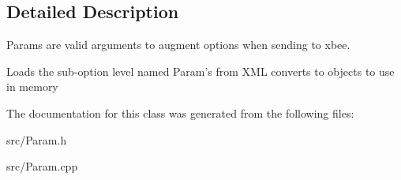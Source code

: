 \subsection{Detailed Description}
Params are valid arguments to augment options when sending to xbee. 

Loads the sub-\/option level named Param's from XML converts to objects to use in memory 

The documentation for this class was generated from the following files:\begin{DoxyCompactItemize}
\item 
src/Param.h\item 
src/Param.cpp\end{DoxyCompactItemize}
